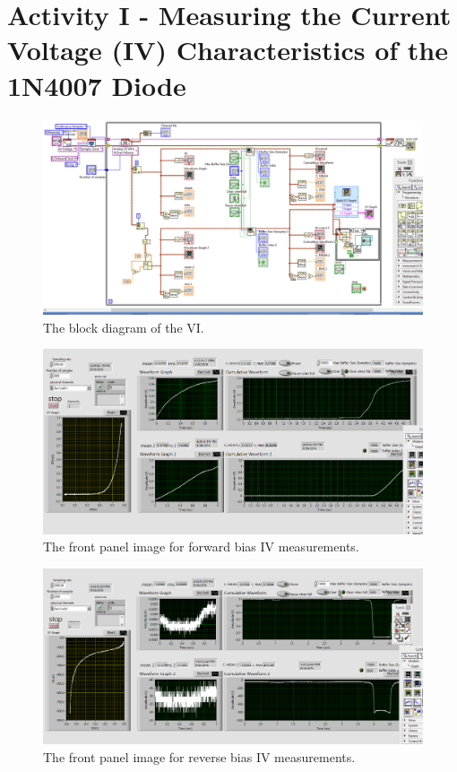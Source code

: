\documentclass[11pt]{article}
\begin{document}
\section{Activity I - Measuring the Current Voltage (IV) Characteristics of the 1N4007 Diode}

\begin{figure}[H]
 \begin{center}
  \includegraphics[width=\linewidth/1]{act1bp}
  \caption{The block diagram of the VI.}
  \label{fig:act1bp}
 \end{center}
\end{figure}

\begin{figure}[H]
 \begin{center}
  \includegraphics[width=\linewidth/1]{act1bias}
  \caption{The front panel image for forward bias IV measurements.}
  \label{fig:act1bias}
 \end{center}
\end{figure}

\begin{figure}[H]
 \begin{center}
  \includegraphics[width=\linewidth/1]{act1rev2}
  \caption{The front panel image for reverse bias IV measurements.}
  \label{fig:act1rev2}
 \end{center}
\end{figure}
\end{document}

